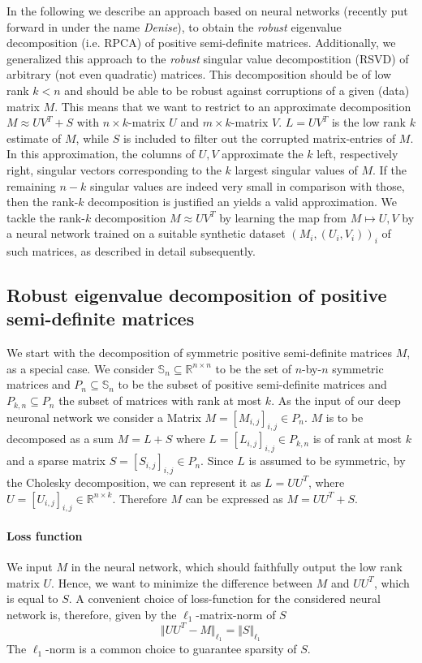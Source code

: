 In the following we describe an approach based on neural networks (recently put forward in \cite{herrera2020denise} under the name \textit{Denise}), to obtain the \textit{robust} eigenvalue decomposition (i.e. RPCA) of positive semi-definite matrices. Additionally, we generalized this approach to the \textit{robust} singular value decompostition (RSVD) of arbitrary (not even quadratic) matrices. This decomposition should be of low rank $k<n$ and should be able to be robust against corruptions of a given (data) matrix $M$. This means that we want to restrict to an approximate decomposition $M \approx UV^T + S$ with $n\times k$-matrix $U$ and $m\times k$-matrix $V$. $L = UV^T$ is the low rank $k$ estimate of $M$, while $S$ is included to filter out the corrupted matrix-entries of $M$. In this approximation, the columns of $U,V$ approximate the $k$ left, respectively right, singular vectors corresponding to the $k$ largest singular values of $M$. If the remaining $n-k$ singular values are indeed very small in comparison with those, then the rank-$k$ decomposition is justified an yields a valid approximation. We tackle the rank-$k$ decomposition $M \approx UV^T$ by learning the map from $M \mapsto U,V$ by a neural network trained on a suitable synthetic dataset $(M_i,(U_i,V_i))_i$ of such matrices, as described in detail subsequently. 



\subsection{Robust eigenvalue decomposition of positive semi-definite matrices}
 
We start with the decomposition of symmetric positive semi-definite matrices $M$, as a special case. We consider $\mathbb{S}_n \subseteq \mathbb{R}^{n \times n}$ to be the set of $n$-by-$n$ symmetric matrices and $P_n\subseteq \mathbb{S}_n$ to be the subset of positive semi-definite matrices and $P_{k,n} \subseteq P_n$ the subset of matrices with rank at most $k$. As the input of our deep neuronal network we consider a Matrix $M = [M_{i,j}]_{i,j} \in P_n$. $M$ is to be decomposed as a sum $M = L + S$ where $L = [L_{i,j}]_{i,j} \in P_{k,n}$ is of rank at most $k$ and a sparse matrix $S = [S_{i,j}]_{i,j} \in P_n$. Since $L$ is assumed to be symmetric, by the Cholesky decomposition, we can represent it as $L=UU^T$, where $U = [U_{i,j}]_{i,j} \in \mathbb{R}^{n \times k}$. Therefore $M$ can be expressed as $M = UU^T + S$.

\paragraph{Loss function}
We input $M$ in the neural network, which should faithfully output the low rank matrix $U$. Hence, we want to minimize the difference between $M$ and $UU^T$, which is equal to $S$. A convenient choice of loss-function for the considered neural network is, therefore, given by the $\ell_1$-matrix-norm of $S$
\[
\Vert UU^T - M \Vert_{\ell_1} = \Vert S \Vert_{\ell_1}
\]
The $\ell_1$-norm is a common choice to guarantee sparsity of $S$.


